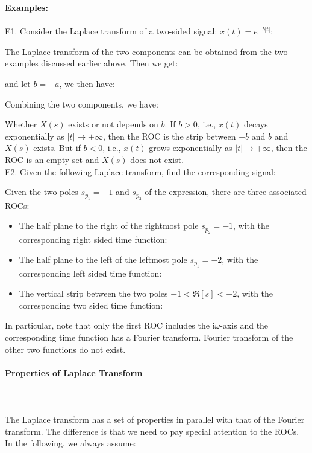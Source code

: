 	\begin{tcolorbox}[colframe=black,colback=white,sharp corners]
	\textbf{{\Large {}}Examples:}\\\\
	E1. Consider the Laplace transform of a two-sided signal:
		$x(t)=e^{-b|t|}$:
	
	\end{tcolorbox}
	\begin{tcolorbox}[colframe=black,colback=white,sharp corners]
	The Laplace transform of the two components can be obtained from the two examples discussed earlier above. Then we get:
	
	and let $b=-a$,  we then have:
	
	Combining the two components, we have:
	
	Whether $X(s)$ exists or not depends on $b$. If $b>0$, i.e., $x(t)$ decays exponentially as $|t| \rightarrow +\infty$, then the ROC is the strip between $-b$ and $b$ and $X(s)$ exists. But if $b<0$, i.e., $x(t)$ grows exponentially as  $|t| \rightarrow +\infty$, then the ROC is an empty set and $X(s)$ does not exist.\\
	
	E2. Given the following Laplace transform, find the corresponding signal:
	
	Given the two poles $s_{p_1}=-1$ and $s_{p_2}$ of the expression, there are three associated ROCs: 
	\begin{itemize}
		\item The half plane to the right of the rightmost pole $s_{p_2}=-1$, with the corresponding right sided time function:
		
		\item The half plane to the left of the leftmost pole $s_{p_1}=-2$, with the corresponding left sided time function:
		
		\item The vertical strip between the two poles $-1 < \Re[s] < -2$, with the corresponding two sided time function:
		 
	\end{itemize}
	In particular, note that only the first ROC includes the $\mathrm{i}\omega$-axis and the corresponding time function has a Fourier transform. Fourier transform of the other two functions do not exist.
	\end{tcolorbox}
	
	\pagebreak
	\paragraph{Properties of Laplace Transform}\label{properties of Laplace Transform}\mbox{}\\\\ 
	The Laplace transform has a set of properties in parallel with that of the Fourier transform. The difference is that we need to pay special attention to the ROCs. In the following, we always assume:
	
